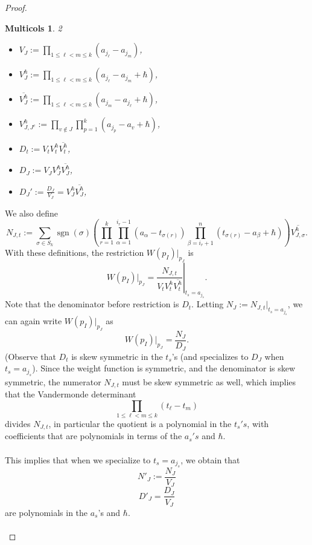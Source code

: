 \documentclass[10pt,a4paper]{amsart}
\newtheorem{multicols}{Multicols}
\DeclareMathOperator{\sgn}{sgn}
\begin{document}
\begin{proof}
\begin{multicols}{2}
\begin{itemize}
\item $V_J := \prod\limits_{1 \leq \ell < m \leq k} (a_{j_\ell} - a_{j_m})$,
\item $V_J^{\hbar} :=  \prod\limits_{1 \leq \ell < m \leq k} (a_{j_\ell} - a_{j_m} + \hbar)$,
\item $\overline{V_J^{\hbar}} := \prod\limits_{1 \leq \ell < m \leq k} (a_{j_m} - a_{j_\ell} + \hbar)$,
\item $V_{J,J^c}^{\hbar} := \prod\limits_{v \not\in J} \prod\limits_{p = 1}^{k} (a_{j_p} - a_{v} + \hbar)$,
\item $D_t := V_t V_t^{\hbar} \overline{V_{t}^{\hbar}}$,
\item $D_J := V_J V_J^{\hbar} \overline{V_{J}^{\hbar}}$,
\item $D_J' := \frac{D_J}{V_J} = V_J^{\hbar}\overline{V_J^{\hbar}}$,
\end{itemize}
\end{multicols}
We also define \[N_{J,t} := \sum\limits_{\sigma \in S_k} \sgn(\sigma) \left(\prod\limits_{r = 1}^k \prod\limits_{\alpha = 1}^{i_{r} - 1} (a_{\alpha} - t_{\sigma(r)}) \prod\limits_{\beta = i_r + 1}^n (t_{\sigma(r)} - a_{\beta} + \hbar) \right) \overline{V_{J,\sigma}^{\hbar}}.\]
With these definitions, the restriction $W(p_I)|_{p_J}$ is
\[W(p_I)|_{p_J} = \left.\dfrac{N_{J,t}}{V_{t}V_{t}^{\hbar}\overline{V_{t}^{\hbar}}}\right|_{t_s = a_{j_s}}.\]
Note that the denominator before restriction is $D_t$.
Letting $N_{J}:=N_{J,t}|_{t_{s}=a_{j_{s}}}$, we can again write $W(p_I)|_{p_J}$ as \[W(p_I)|_{p_J} = \dfrac{N_J}{D_J}.\](Observe that $D_{t}$ is skew symmetric in the $t_{s}$'s (and specializes to $D_{J}$ when $t_{s}=a_{j_{s}}$). Since the weight function is symmetric, and the denominator is skew symmetric, the numerator $N_{J,t}$ must be skew symmetric as well, which implies that the Vandermonde determinant 
\[\prod\limits_{1 \leq \ell < m \leq k}(t_{\ell}-t_{m})\]
divides $N_{J,t}$, in particular the quotient is a polynomial in the $t_{s}'s$, with coefficients that are polynomials in terms of the $a_{s}'s$ and $\hbar$.\\\\
This implies that when we specialize to $t_{s}=a_{j_{s}}$, we obtain that
\[N'_{J}:=\frac{N_{J}}{V_{J}}\]
\[D'_{J} =\frac{D_{J}}{V_{J}}\]
are polynomials in the $a_{s}$'s and $\hbar$.\\\\



\end{proof}
\end{document}
